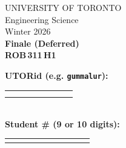 \documentclass[12pt]{article}
\begin{document}
\newcommand{\spacer}{
  \vspace{5mm}\\
}

\newcommand{\hspacer}{\\
}

\noindent
\begin{minipage}{0.45\textwidth}
\large
\noindent  UNIVERSITY OF TORONTO\\
  Engineering Science\\[1.75ex]
  Winter 2026\\[1.75ex]
  \textbf{Finale (Deferred)} \\
  \textbf{{ROB\,311\,H1}}
\end{minipage}%
\hspace{-1cm}
\begin{minipage}{0.6\textwidth}
\raggedleft
\textbf{UTORid (e.g. \texttt{gummalur}):} \\[1ex]
\begin{tabular}{|c|c|c|c|c|c|c|c|}
  \hline
  \hspace{1.2em}\; & \hspace{1.2em}\; & \hspace{1.2em}\; & \hspace{1.2em}\; & \hspace{1.2em}\; & \hspace{1.2em}\; & \hspace{1.2em}\; & \hspace{1.2em}\; \\
  \hspace{1.2em}\; & \hspace{1.2em}\; & \hspace{1.2em}\; & \hspace{1.2em}\; & \hspace{1.2em}\; & \hspace{1.2em}\; & \hspace{1.2em}\; & \hspace{1.2em}\;\\
  \hline
\end{tabular}\\[2ex]
\textbf{Student \# (9 or 10 digits):} \\[1ex]
\begin{tabular}{|c|c|c|c|c|c|c|c|c|c|}
  \hline
  \hspace{1.2em}\; & \hspace{1.2em}\; & \hspace{1.2em}\; & \hspace{1.2em}\; & \hspace{1.2em}\; & \hspace{1.2em}\; & \hspace{1.2em}\; & \hspace{1.2em}\; & \hspace{1.2em}\; & \hspace{1.2em}\; \\

\end{tabular}
\end{minipage}
\end{document}
